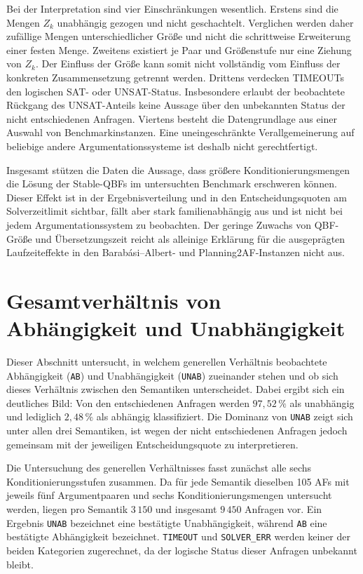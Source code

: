 Bei der Interpretation sind vier Einschränkungen wesentlich. Erstens sind
die Mengen \(Z_k\) unabhängig gezogen und nicht geschachtelt. Verglichen
werden daher zufällige Mengen unterschiedlicher Größe und nicht die
schrittweise Erweiterung einer festen Menge. Zweitens existiert je Paar
und Größenstufe nur eine Ziehung von \(Z_k\). Der Einfluss der Größe kann
somit nicht vollständig vom Einfluss der konkreten Zusammensetzung
getrennt werden. Drittens verdecken TIMEOUTs den logischen SAT- oder
UNSAT-Status. Insbesondere erlaubt der beobachtete Rückgang des
UNSAT-Anteils keine Aussage über den unbekannten Status der nicht entschiedenen
Anfragen. Viertens besteht die Datengrundlage aus einer Auswahl von
Benchmarkinstanzen. Eine uneingeschränkte Verallgemeinerung auf beliebige
andere Argumentationssysteme ist deshalb nicht gerechtfertigt.

Insgesamt stützen die Daten die Aussage, dass größere
Konditionierungsmengen die Lösung der Stable-QBFs im untersuchten
Benchmark erschweren können. Dieser Effekt ist in der Ergebnisverteilung
und in den Entscheidungsquoten am Solverzeitlimit sichtbar, fällt aber stark
familienabhängig aus und ist nicht bei jedem Argumentationssystem zu
beobachten. Der geringe Zuwachs von QBF-Größe und Übersetzungszeit reicht
als alleinige Erklärung für die ausgeprägten Laufzeiteffekte in den
Barabási--Albert- und Planning2AF-Instanzen nicht aus.
\fi

\section{Gesamtverhältnis von Abhängigkeit und Unabhängigkeit}
\label{sec:ci-status}
Dieser Abschnitt untersucht, in welchem generellen Verhältnis beobachtete
Abhängigkeit (\texttt{AB}) und Unabhängigkeit (\texttt{UNAB}) zueinander
stehen und ob sich dieses Verhältnis zwischen den Semantiken unterscheidet.
Dabei ergibt sich ein deutliches Bild: Von den entschiedenen Anfragen werden
\(97{,}52\,\%\) als unabhängig und lediglich \(2{,}48\,\%\) als abhängig
klassifiziert. Die Dominanz von \texttt{UNAB} zeigt sich unter allen drei
Semantiken, ist wegen der nicht entschiedenen Anfragen jedoch gemeinsam mit
der jeweiligen Entscheidungsquote zu interpretieren.

Die Untersuchung des generellen Verhältnisses fasst zunächst alle sechs
Konditionierungsstufen zusammen. Da für jede Semantik dieselben 105 AFs mit
jeweils fünf Argumentpaaren und sechs Konditionierungsmengen untersucht
werden, liegen pro Semantik \(3\,150\) und insgesamt \(9\,450\) Anfragen
vor. Ein Ergebnis \texttt{UNAB} bezeichnet eine bestätigte Unabhängigkeit,
während \texttt{AB} eine bestätigte Abhängigkeit bezeichnet.
\texttt{TIMEOUT} und \texttt{SOLVER\_ERR} werden keiner der beiden
Kategorien zugerechnet, da der logische Status dieser Anfragen unbekannt
bleibt.

